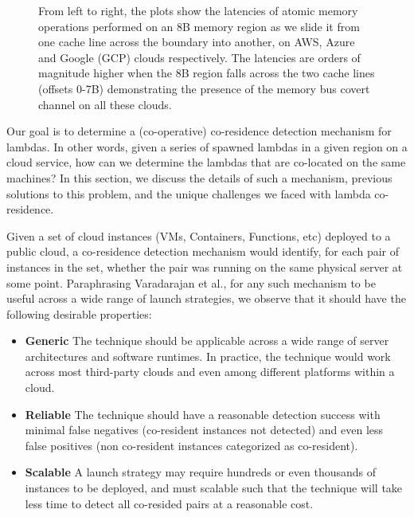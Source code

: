 \begin{figure}[h!]
\begin{subfigure}{.33\textwidth}
\end{subfigure}
\caption{From left to right, the plots show the latencies of atomic 
      memory operations performed on an 8B memory region as we slide it 
      from one cache line across the boundary into another, on AWS, Azure and 
      Google (GCP) clouds respectively. The latencies 
      are orders of magnitude higher when the 8B region falls across the 
      two cache lines (offsets 0-7B) demonstrating the presence of 
      the memory bus covert channel on all these clouds. \label{fig:membus_clouds}}
\label{fig:fig}
\end{figure}


Our goal is to determine a (co-operative) co-residence detection mechanism for
lambdas. In other words, given a series of spawned lambdas in a
given region on a cloud service, how can we determine the lambdas that are
co-located on the same machines?  In this section, we discuss the details of
such a mechanism, previous solutions to this problem, and the unique challenges
we faced with lambda co-residence.

Given a set of cloud instances (VMs, Containers, Functions, etc) deployed
to a public cloud, a co-residence detection mechanism would identify, for each 
pair of instances in the set, whether the pair was running on the same physical 
server at some point. Paraphrasing Varadarajan et al.\cite{varadarajan2015}, for 
any such mechanism to be useful across a wide range of 
launch strategies, we observe that it should have the following desirable 
properties:

\begin{itemize}
    \item \textbf{Generic} The technique should be applicable across a wide
    range of server architectures and software runtimes. In practice, the
    technique would work across most third-party clouds and even among different
    platforms within a cloud.
    \item \textbf{Reliable} The technique should have a reasonable detection success
    with minimal false negatives (co-resident instances not detected) and even 
    less false positives (non co-resident instances categorized as co-resident).
    \item \textbf{Scalable} A launch strategy may require hundreds or even thousands 
    of instances to be deployed, and must scalable such that the 
    technique will take less time to detect all co-resided pairs at a reasonable cost.
\end{itemize}

